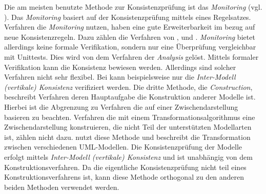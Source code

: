 Die am meisten benutzte Methode zur Konsistenzprüfung ist das \emph{Monitoring} (vgl. \cite{Usman2008}).
Das \emph{Monitoring} basiert auf der Konsistenzprüfung mittels eines Regelsatzes. 
Verfahren die \emph{Monitoring} nutzen, haben eine gute Erweiterbarkeit im bezug auf neue Konsistenzregeln.
Dazu zählen die Verfahren von \cite{Rasch2003}, \cite{Mens2005} und \cite{Egyed2006}.
\emph{Monitoring} bietet allerdings keine formale Verifikation, sondern nur eine Überprüfung vergleichbar mit Unittests.
Dies wird von dem Verfahren der \emph{Analysis} gelöst.
Mittels formaler Verifikation kann die Konsistenz bewiesen werden.
Allerdings sind solcher Verfahren nicht sehr flexibel.
Bei \cite{Shinkawa2006} kann beispielsweise nur die \emph{Inter-Modell (vertikale) Konsistenz} verifiziert werden.
Die dritte Methode, die \emph{Construction}, beschreibt Verfahren deren Hauptaufgabe die Konstruktion anderer Modelle ist.
Hierbei ist die Abgrenzung zu Verfahren die auf einer Zwischendarstellung basieren zu beachten.
Verfahren die mit einem Transformationsalgorithmus eine Zwischendarstellung konstruieren, die nicht Teil der unterstützten Modellarten ist, zählen nicht dazu.
\cite{Egyed2001} nutzt diese Methode und beschreibt die Transformation zwischen verschiedenen UML-Modellen.
Die Konsistenzprüfung der Modelle erfolgt mittels \emph{Inter-Modell (vertikale) Konsistenz} und ist unabhängig von dem Konstruktionsverfahren.
Da die eigentliche Konsistenzprüfung nicht teil eines Konstruktionsverfahrens ist, kann diese Methode orthogonal zu den anderen beiden Methoden verwendet werden.

